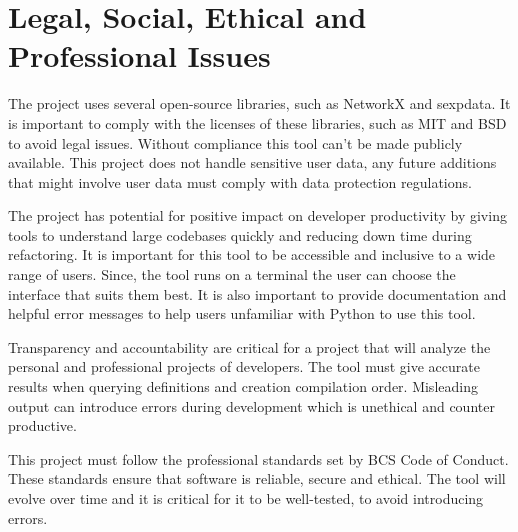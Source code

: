 
\chapter{Legal, Social, Ethical and Professional Issues}


The project uses several open-source libraries, such as NetworkX and sexpdata.
It is important to comply with the licenses of these libraries, such as MIT and
BSD to avoid legal issues. Without compliance this tool can't be made publicly
available. This project does not handle sensitive user data, any future
additions that might involve user data must comply with data protection
regulations.

The project has potential for positive impact on developer productivity by
giving tools to understand large codebases quickly and reducing down time
during refactoring. It is important for this tool to be accessible and
inclusive to a wide range of users. Since, the tool runs on a terminal the user
can choose the interface that suits them best. It is also important to provide
documentation and helpful error messages to help users unfamiliar with Python
to use this tool.

Transparency and accountability are critical for a project that will analyze
the personal and professional projects of developers. The tool must give
accurate results when querying definitions and creation compilation order.
Misleading output can introduce errors during development which is unethical
and counter productive.

This project must follow the professional standards set by BCS Code of Conduct.
These standards ensure that software is reliable, secure and ethical. The tool
will evolve over time and it is critical for it to be well-tested, to avoid
introducing errors.

%
